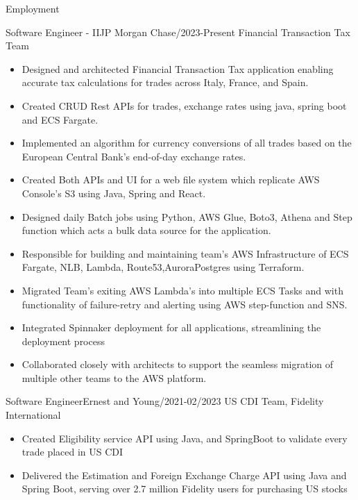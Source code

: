 \documentclass[]{mcdowellcv}
\begin{document}
    \begin{cvsection}{Employment}

        \begin{cvsubsection}{Software Engineer - II}{JP Morgan Chase}{/2023-Present}
            Financial Transaction Tax Team
            \begin{itemize}
                \item Designed and architected Financial Transaction Tax application enabling accurate tax calculations for trades across Italy, France, and Spain.
                \item Created CRUD Rest APIs for trades, exchange rates using java, spring boot and ECS Fargate.
                \item Implemented an algorithm for currency conversions of all trades based on the European Central Bank’s end-of-day exchange rates.
                \item Created Both APIs and UI for a web file system which replicate AWS Console's S3 using Java, Spring and React.
                \item Designed daily Batch jobs using Python, AWS Glue, Boto3, Athena and Step function which acts a bulk data source for the application.
                \item Responsible for building and maintaining team's AWS Infrastructure of ECS Fargate, NLB, Lambda, Route53,AuroraPostgres using Terraform.
                \item Migrated Team's exiting AWS Lambda's into multiple ECS Tasks and with functionality of failure-retry and alerting using AWS step-function and SNS.
                \item Integrated Spinnaker deployment for all applications, streamlining the deployment process
                \item Collaborated closely with architects to support the seamless migration of multiple other teams to the AWS platform.
            \end{itemize}
        \end{cvsubsection}
        \begin{cvsubsection}{Software Engineer}{Ernest and Young}{/2021-02/2023}
            US CDI Team,    Fidelity International
            \begin{itemize}
                \item Created Eligibility service API using Java, and SpringBoot to validate every trade placed in US CDI
                \item Delivered the Estimation and Foreign Exchange Charge API using Java and Spring Boot, serving over 2.7 million Fidelity users for purchasing US stocks

\end{itemize}
\end{cvsubsection}
\end{cvsection}
\end{document}
